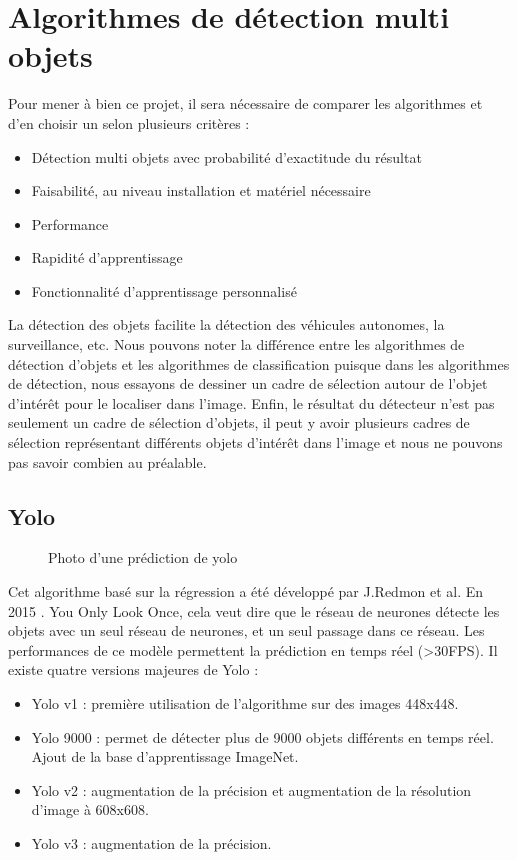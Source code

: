 \documentclass[debug,nodate,hideweeklyreports,noposter]{polytech/polytech}
\begin{document}
\section{Algorithmes de détection multi objets}
Pour mener à bien ce projet, il sera nécessaire de comparer les algorithmes et d’en choisir un selon plusieurs critères :
\begin{itemize}
\item Détection multi objets avec probabilité d’exactitude du résultat
\item Faisabilité, au niveau installation et matériel nécessaire
\item Performance
\item Rapidité d’apprentissage
\item Fonctionnalité d’apprentissage personnalisé
\end{itemize}

La détection des objets facilite la détection des véhicules autonomes, la surveillance, etc. Nous pouvons noter la différence entre les algorithmes de détection d’objets et les algorithmes de classification puisque dans les algorithmes de détection, nous essayons de dessiner un cadre de sélection autour de l’objet d’intérêt pour le localiser dans l’image. Enfin, le résultat du détecteur n’est pas seulement un cadre de sélection d’objets, il peut y avoir plusieurs cadres de sélection représentant différents objets d’intérêt dans l’image et nous ne pouvons pas savoir combien au préalable.

\subsection{Yolo}

\begin{figure}
  \caption{Photo d'une prédiction de yolo}
  \label{fig:yolo}
\end{figure}

Cet algorithme basé sur la régression a été développé par J.Redmon et al. En 2015 \cite{DBLP:journals/corr/RedmonDGF15}. You Only Look Once, cela veut dire que le réseau de neurones détecte les objets avec un seul réseau de neurones, et un seul passage dans ce réseau. Les performances de ce modèle permettent la prédiction en temps réel (>30FPS).
Il existe quatre versions majeures de Yolo :
\begin{itemize}
\item Yolo v1 : première utilisation de l’algorithme sur des images 448x448.
\item Yolo 9000 : permet de détecter plus de 9000 objets différents en temps réel. Ajout de la base d’apprentissage ImageNet.
\item Yolo v2 : augmentation de la précision et augmentation de la résolution d’image à 608x608.
\item Yolo v3 : augmentation de la précision.\cite{DBLP:journals/corr/abs-1804-02767}
\end{itemize}
\end{document}
